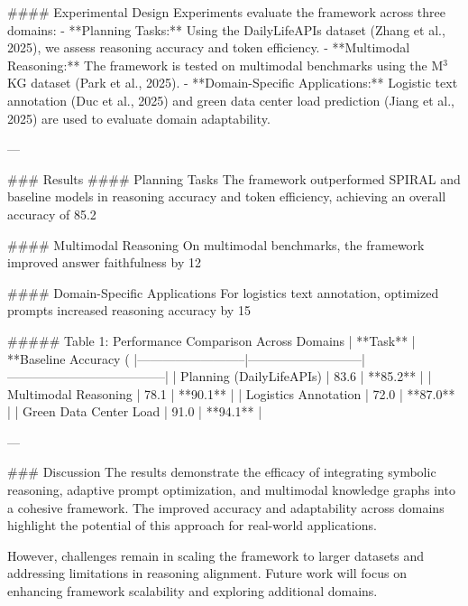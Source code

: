 #### Experimental Design
Experiments evaluate the framework across three domains:
- **Planning Tasks:** Using the DailyLifeAPIs dataset (Zhang et al., 2025), we assess reasoning accuracy and token efficiency.
- **Multimodal Reasoning:** The framework is tested on multimodal benchmarks using the M$^3$KG dataset (Park et al., 2025).
- **Domain-Specific Applications:** Logistic text annotation (Duc et al., 2025) and green data center load prediction (Jiang et al., 2025) are used to evaluate domain adaptability.

---

### Results
#### Planning Tasks
The framework outperformed SPIRAL and baseline models in reasoning accuracy and token efficiency, achieving an overall accuracy of 85.2%

#### Multimodal Reasoning
On multimodal benchmarks, the framework improved answer faithfulness by 12%

#### Domain-Specific Applications
For logistics text annotation, optimized prompts increased reasoning accuracy by 15%

##### Table 1: Performance Comparison Across Domains
| **Task**                | **Baseline Accuracy (%
|--------------------------|---------------------------|--------------------------------------|
| Planning (DailyLifeAPIs) | 83.6                     | **85.2**                             |
| Multimodal Reasoning     | 78.1                     | **90.1**                             |
| Logistics Annotation     | 72.0                     | **87.0**                             |
| Green Data Center Load   | 91.0                     | **94.1**                             |

---

### Discussion
The results demonstrate the efficacy of integrating symbolic reasoning, adaptive prompt optimization, and multimodal knowledge graphs into a cohesive framework. The improved accuracy and adaptability across domains highlight the potential of this approach for real-world applications.

However, challenges remain in scaling the framework to larger datasets and addressing limitations in reasoning alignment. Future work will focus on enhancing framework scalability and exploring additional domains.


